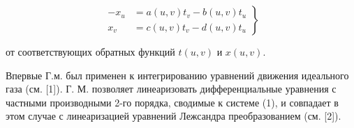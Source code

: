 \documentclass[10pt]{article}
\begin{document}
\[

\left.\begin{array}{rl}

-x_{u} & =a(u, v) t_{v}-b(u, v) t_{u} \\

x_{v} & =c(u, v) t_{v}-d(u, v) t_{u}

\end{array}\right\}

\]



от соответствующих обратных функций $t(u, v)$ и $x(u, v)$.



Впервые Г.м. был применен к интегрированию уравнений движения идеального газа (см. [1]). Г. М. позволяет линеаризовать дифференциальные уравнения с частными производными 2-го порядка, сводимые к системе (1), и совпадает в этом случае с линеаризацией уравнений Лежсандра преобразованием (см. [2]).
\end{document}
